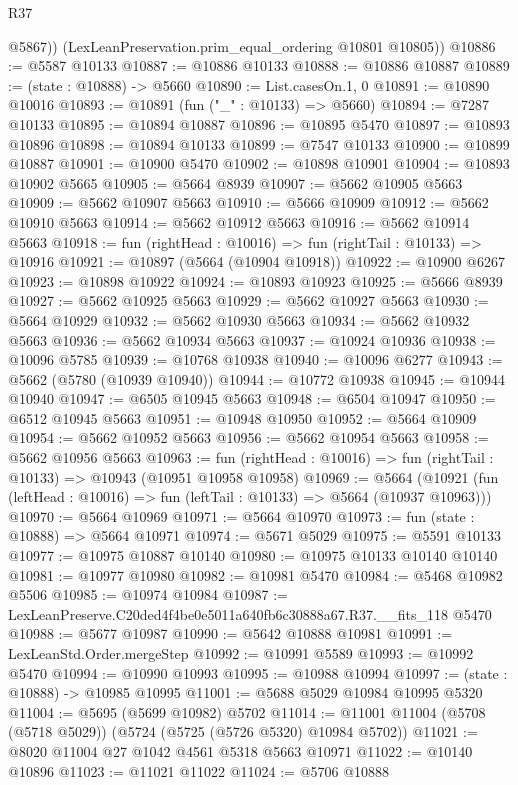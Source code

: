 \begin{lexlean}{R37}
\begin{coremodule}
          @5867))
      (LexLeanPreservation.prim_equal_ordering @10801 @10805))
@10886 := @5587 @10133
@10887 := @10886 @10133
@10888 := @10886 @10887
@10889 := (state : @10888) -> @5660
@10890 := List.casesOn.{1, 0}
@10891 := @10890 @10016
@10893 := @10891 (fun ("_" : @10133) => @5660)
@10894 := @7287 @10133
@10895 := @10894 @10887
@10896 := @10895 @5470
@10897 := @10893 @10896
@10898 := @10894 @10133
@10899 := @7547 @10133
@10900 := @10899 @10887
@10901 := @10900 @5470
@10902 := @10898 @10901
@10904 := @10893 @10902 @5665
@10905 := @5664 @8939
@10907 := @5662 @10905 @5663
@10909 := @5662 @10907 @5663
@10910 := @5666 @10909
@10912 := @5662 @10910 @5663
@10914 := @5662 @10912 @5663
@10916 := @5662 @10914 @5663
@10918 := fun (rightHead : @10016) => fun (rightTail : @10133) => @10916
@10921 := @10897 (@5664 (@10904 @10918))
@10922 := @10900 @6267
@10923 := @10898 @10922
@10924 := @10893 @10923
@10925 := @5666 @8939
@10927 := @5662 @10925 @5663
@10929 := @5662 @10927 @5663
@10930 := @5664 @10929
@10932 := @5662 @10930 @5663
@10934 := @5662 @10932 @5663
@10936 := @5662 @10934 @5663
@10937 := @10924 @10936
@10938 := @10096 @5785
@10939 := @10768 @10938
@10940 := @10096 @6277
@10943 := @5662 (@5780 (@10939 @10940))
@10944 := @10772 @10938
@10945 := @10944 @10940
@10947 := @6505 @10945 @5663
@10948 := @6504 @10947
@10950 := @6512 @10945 @5663
@10951 := @10948 @10950
@10952 := @5664 @10909
@10954 := @5662 @10952 @5663
@10956 := @5662 @10954 @5663
@10958 := @5662 @10956 @5663
@10963 := fun (rightHead : @10016) => fun (rightTail : @10133) => @10943 (@10951 @10958 @10958)
@10969 := @5664
    (@10921 (fun (leftHead : @10016) => fun (leftTail : @10133) => @5664 (@10937 @10963)))
@10970 := @5664 @10969
@10971 := @5664 @10970
@10973 := fun (state : @10888) => @5664 @10971
@10974 := @5671 @5029
@10975 := @5591 @10133
@10977 := @10975 @10887 @10140
@10980 := @10975 @10133 @10140 @10140
@10981 := @10977 @10980
@10982 := @10981 @5470
@10984 := @5468 @10982 @5506
@10985 := @10974 @10984
@10987 := LexLeanPreserve.C20ded4f4be0e5011a640fb6c30888a67.R37.__fits_118 @5470
@10988 := @5677 @10987
@10990 := @5642 @10888 @10981
@10991 := LexLeanStd.Order.mergeStep
@10992 := @10991 @5589
@10993 := @10992 @5470
@10994 := @10990 @10993
@10995 := @10988 @10994
@10997 := (state : @10888) -> @10985 @10995
@11001 := @5688 @5029 @10984 @10995 @5320
@11004 := @5695 (@5699 @10982) @5702
@11014 := @11001 @11004 (@5708 (@5718 @5029)) (@5724 (@5725 (@5726 @5320) @10984 @5702))
@11021 := @8020 @11004 @27 @1042 @4561 @5318 @5663 @10971
@11022 := @10140 @10896
@11023 := @11021 @11022
@11024 := @5706 @10888

\end{coremodule}
\end{lexlean}
